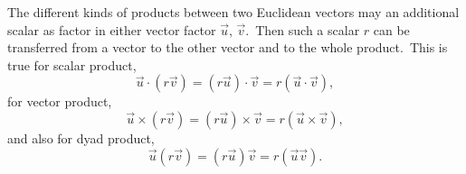 \documentclass[12pt]{article}
\theoremstyle{definition}
\begin{document}
The different kinds of products between two Euclidean vectors may  an additional scalar as factor in either vector factor $\vec{u}$, $\vec{v}$.\, Then such a scalar $r$ can be transferred from a vector to the other vector and to the whole product.\, This is true for scalar product,
$$\vec{u}\!\cdot\!(r\vec{v}) = (r\vec{u})\!\cdot\!\vec{v} = r(\vec{u}\!\cdot\!\vec{v}),$$
for vector product,
$$\vec{u}\!\times\!(r\vec{v}) = (r\vec{u})\!\times\!\vec{v} = r(\vec{u}\!\times\!\vec{v}),$$
and also for dyad product,
$$\vec{u}(r\vec{v}) = (r\vec{u})\vec{v} = r(\vec{u}\vec{v}).$$
\end{document}
